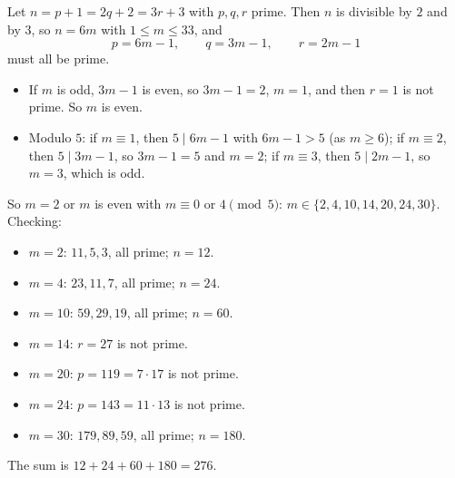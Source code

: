 Let $n=p+1=2q+2=3r+3$ with $p,q,r$ prime. Then $n$ is divisible by $2$ and by $3$, so $n=6m$ with $1\le m\le33$, and
\[p=6m-1,\qquad q=3m-1,\qquad r=2m-1\]
must all be prime.
\begin{itemize}
\item If $m$ is odd, $3m-1$ is even, so $3m-1=2$, $m=1$, and then $r=1$ is not prime. So $m$ is even.
\item Modulo $5$: if $m\equiv1$, then $5\mid6m-1$ with $6m-1>5$ (as $m\ge6$); if $m\equiv2$, then $5\mid3m-1$, so $3m-1=5$ and $m=2$; if $m\equiv3$, then $5\mid2m-1$, so $m=3$, which is odd.
\end{itemize}
So $m=2$ or $m$ is even with $m\equiv0$ or $4\pmod5$: $m\in\{2,4,10,14,20,24,30\}$. Checking:
\begin{itemize}
\item $m=2$: $11,5,3$, all prime; $n=12$.
\item $m=4$: $23,11,7$, all prime; $n=24$.
\item $m=10$: $59,29,19$, all prime; $n=60$.
\item $m=14$: $r=27$ is not prime.
\item $m=20$: $p=119=7\cdot17$ is not prime.
\item $m=24$: $p=143=11\cdot13$ is not prime.
\item $m=30$: $179,89,59$, all prime; $n=180$.
\end{itemize}
The sum is $12+24+60+180=\boxed{276}$.
